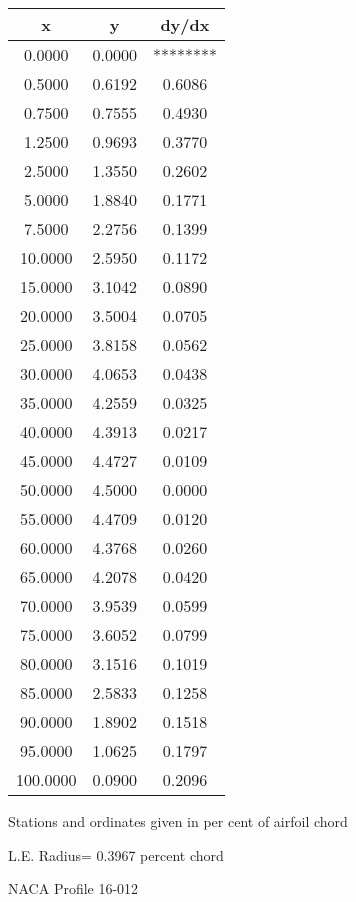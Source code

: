 \documentclass[11pt]{book}
\begin{document}
 \vspace{8mm}
 \begin{tabular}{|c|c|c|} \hline 
  x  &  y  &  dy/dx \\
 \hline
0.0000 & 0.0000 & ******** \\
0.5000 & 0.6192 & 0.6086 \\
0.7500 & 0.7555 & 0.4930 \\
1.2500 & 0.9693 & 0.3770 \\
2.5000 & 1.3550 & 0.2602 \\
5.0000 & 1.8840 & 0.1771 \\
7.5000 & 2.2756 & 0.1399 \\
10.0000 & 2.5950 & 0.1172 \\
15.0000 & 3.1042 & 0.0890 \\
20.0000 & 3.5004 & 0.0705 \\
25.0000 & 3.8158 & 0.0562 \\
30.0000 & 4.0653 & 0.0438 \\
35.0000 & 4.2559 & 0.0325 \\
40.0000 & 4.3913 & 0.0217 \\
45.0000 & 4.4727 & 0.0109 \\
50.0000 & 4.5000 & 0.0000 \\
55.0000 & 4.4709 & 0.0120 \\
60.0000 & 4.3768 & 0.0260 \\
65.0000 & 4.2078 & 0.0420 \\
70.0000 & 3.9539 & 0.0599 \\
75.0000 & 3.6052 & 0.0799 \\
80.0000 & 3.1516 & 0.1019 \\
85.0000 & 2.5833 & 0.1258 \\
90.0000 & 1.8902 & 0.1518 \\
95.0000 & 1.0625 & 0.1797 \\
100.0000 & 0.0900 & 0.2096 \\
 \hline
 \end{tabular}
 \vspace{8mm}


Stations and ordinates given in per cent of airfoil chord 


L.E. Radius=  0.3967 percent chord
 \newpage
  \label{p16-012}
 \begin{Large}
 NACA Profile 16-012
 \end{Large}
  
\end{document}
